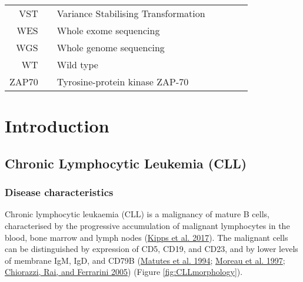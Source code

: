 \documentclass[11pt, a4paper, twosided]{book}
\begin{document}
\newpage
\begin{tabular}{rp{0.2cm}lp{1cm}rp{0.2cm}l}

  VST & & Variance Stabilising Transformation \\
    WES & & Whole exome sequencing \\
    WGS & & Whole genome sequencing \\
    WT & & Wild type \\
    ZAP70 & & Tyrosine-protein kinase ZAP-70 \\

\end{tabular}
%
%
\newpage
\pagestyle{plain} %
\setcounter{page}{1}    %

\hypertarget{introduction}{%
\chapter{Introduction}\label{introduction}}

\hypertarget{chronic-lymphocytic-leukemia-cll}{%
\section{Chronic Lymphocytic Leukemia (CLL)}\label{chronic-lymphocytic-leukemia-cll}}

\hypertarget{intro-disease-characteristics}{%
\subsection{Disease characteristics}\label{intro-disease-characteristics}}

Chronic lymphocytic leukaemia (CLL) is a malignancy of mature B cells, characterised by the progressive accumulation of malignant lymphocytes in the blood, bone marrow and lymph nodes (\protect\hyperlink{ref-Kipps2017}{Kipps et al. 2017}). The malignant cells can be distinguished by expression of CD5, CD19, and CD23, and by lower levels of membrane IgM, IgD, and CD79B (\protect\hyperlink{ref-Matutes1994}{Matutes et al. 1994}; \protect\hyperlink{ref-Moreau1997}{Moreau et al. 1997}; \protect\hyperlink{ref-Chiorazzi2005}{Chiorazzi, Rai, and Ferrarini 2005}) (Figure \ref{fig:CLLmorphology}).
\end{document}
